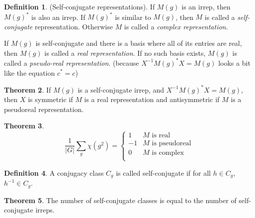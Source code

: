 \documentclass[12pt, letterpaper]{article}
\theoremstyle{definition} %
\newtheorem{thm}{Theorem}[section] %
\newtheorem{defn}[thm]{Definition} %
\begin{document}
\begin{defn} (Self-conjugate representations).
  If $M(g)$ is an irrep, then $M(g)^*$ is also an irrep. If $M(g)^*$ is similar to $M(g)$, then $M$ is called a \emph{self-conjugate} 
  representation. Otherwise $M$ is called a \emph{complex representation}.

  If $M(g)$ is self-conjugate and there is a basis where all of its entries are real, then $M(g)$ is called a \emph{real representation}.
  If no such basis exists, $M(g)$ is called a \emph{pseudo-real representation}. (because $X^{-1} M(g)^* X=M(g)$ looks a bit like the 
  equation $c^*=c$)
\end{defn}

\begin{thm}
  If $M(g)$ is a self-conjugate irrep, and $X^{-1} M(g)^* X=M(g)$, then $X$ is symmetric if $M$ is a real representation and antisymmetric if $M$ 
  is a pseudoreal representation.
\end{thm}
\begin{thm}
  \begin{equation*}
    \frac{1}{|G|}\sum_g \chi(g^2)=
\begin{cases} 
  1 & M\text{ is real} \\
  -1 & M\text{ is pseudoreal} \\
  0 & M\text{ is complex} \\
   \end{cases}
  \end{equation*}
\end{thm}
\begin{defn}
  A conjugacy class $C_g$ is called self-conjugate
  if for all $h\in C_g$, $h^{-1}\in C_g$.
\end{defn}
\begin{thm}
  The number of self-conjugate classes is equal to the number of self-conjugate irreps.
\end{thm}
\end{document}
